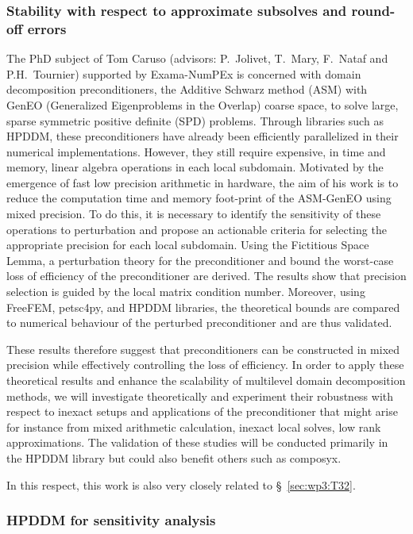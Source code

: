  \subsubsection{Stability with respect to approximate subsolves and round-off errors}
\label{sec:wp3:T31:ddmroundoff}
The PhD subject of Tom Caruso (advisors: P.~Jolivet, T.~Mary, F.~Nataf and P.H.~Tournier) supported by Exama-NumPEx is concerned with domain decomposition preconditioners, the Additive Schwarz method (ASM) with GenEO (Generalized Eigenproblems in the Overlap) coarse space, to solve large, sparse symmetric positive definite (SPD) problems. 
Through libraries such as HPDDM, these preconditioners have already been efficiently parallelized in their numerical implementations. 
However, they still require expensive, in time and memory, linear algebra operations in each local subdomain. 
Motivated by the emergence of fast low precision arithmetic in hardware, the aim of his work is to reduce the computation time and memory foot-print of the ASM-GenEO using mixed precision. 
To do this, it is necessary to identify the sensitivity of these operations to perturbation and propose an actionable criteria for selecting the appropriate precision for each local subdomain.
Using the Fictitious Space Lemma, a perturbation theory for the preconditioner and bound the worst-case loss of efficiency of the preconditioner are derived. The results show that  precision selection is guided by the local matrix condition number. 
Moreover, using FreeFEM, petsc4py, and HPDDM libraries, the theoretical bounds are compared to numerical behaviour of the perturbed preconditioner and are thus validated. 

These results therefore suggest that preconditioners can be constructed in mixed precision while effectively controlling the loss of efficiency. In order to apply these theoretical results and enhance the scalability of
multilevel domain decomposition methods, we will investigate theoretically and experiment their
robustness with respect to inexact setups and applications of the preconditioner that might arise for
instance from mixed arithmetic calculation, inexact local solves, low rank approximations. The
validation of these studies will be conducted primarily in the HPDDM library but could also benefit
others such as composyx. 


 In this respect, this work is also very closely related to \S~\ref{sec:wp3:T32}. 


 \subsubsection{HPDDM for sensitivity analysis}
 
